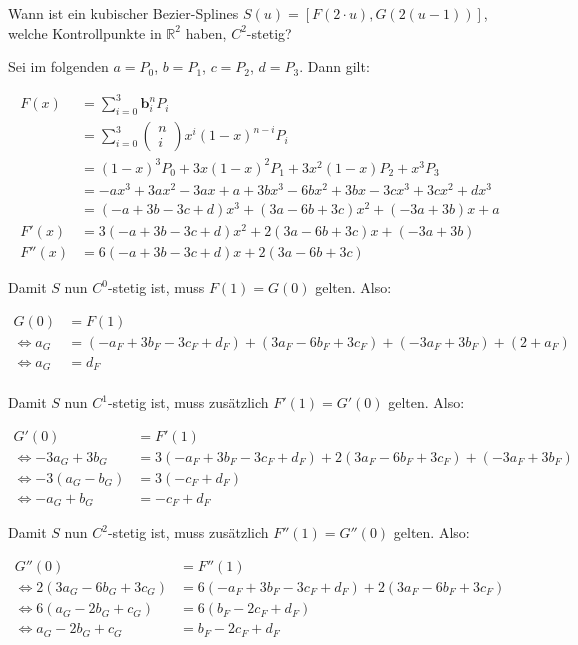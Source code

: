 \documentclass[a4paper]{scrartcl}
\begin{document}
    Wann ist ein kubischer Bezier-Splines $S(u) = [F(2 \cdot u), G(2(u-1))]$,
    welche Kontrollpunkte in $\mathbb{R}^2$ haben, $C^2$-stetig?

    Sei im folgenden $a = P_0$, $b = P_1$, $c = P_2$, $d= P_3$. Dann gilt:

    \begin{align}
        F(x) &= \sum_{i=0}^3 \mathbf{b}_i^n P_i\\
             &= \sum_{i=0}^3 \begin{pmatrix}n\\i\end{pmatrix} x^{i} (1-x)^{n-i}  P_i\\
             &= (1-x)^3 P_0 + 3 x (1-x)^2 P_1 + 3 x^2 (1-x) P_2 + x^3 P_3\\
             &= -a x^3+3 a x^2-3 a x+a+3 b x^3-6 b x^2+3 b x-3 c x^3+3 c x^2+d x^3\\
             &= (-a + 3 b-3 c+d) x^3  + (3 a-6 b+3 c) x^2 + (-3 a+3 b) x + a\\
        F'(x)&= 3 (-a + 3 b-3 c+d) x^2 + 2 (3 a-6 b+3 c) x + (-3 a+3 b)\\
        F''(x) &= 6 (-a + 3 b-3 c+d) x + 2 (3 a-6 b+3 c)
    \end{align}

    Damit $S$ nun $C^0$-stetig ist, muss $F(1) = G(0)$ gelten. Also:

    \begin{align}
        G(0) &= F(1)\\
    \Leftrightarrow a_G
        &= (-a_F + 3 b_F-3 c_F+d_F)  + (3 a_F-6 b_F+3 c_F) + (-3 a_F+3 b_F) + (2+a_F)\\
    \Leftrightarrow a_G &= d_F\\
    \end{align}

    Damit $S$ nun $C^1$-stetig ist, muss zusätzlich $F'(1) = G'(0)$ gelten. Also:

    \begin{align}
        G'(0) &= F'(1)\\
    \Leftrightarrow -3 a_G+3 b_G
        &= 3 (-a_F + 3 b_F-3 c_F+d_F) + 2 (3 a_F-6 b_F+3 c_F) + (-3 a_F+3 b_F)\\
    \Leftrightarrow -3 (a_G-b_G) &= 3 (- c_F+d_F)\\
    \Leftrightarrow -a_G + b_G &= - c_F + d_F
    \end{align}

    Damit $S$ nun $C^2$-stetig ist, muss zusätzlich $F''(1) = G''(0)$ gelten. Also:

    \begin{align}
        G''(0) &= F''(1)\\
        \Leftrightarrow 2 (3 a_G-6 b_G+3 c_G)
                     &= 6 (-a_F + 3 b_F-3 c_F+d_F) + 2 (3 a_F-6 b_F+3 c_F)\\
        \Leftrightarrow 6 (a_G - 2 b_G + c_G) &= 6 (b_F-2 c_F+d_F)\\
        \Leftrightarrow a_G - 2 b_G + c_G &= b_F-2 c_F+d_F
    \end{align}
\end{document}
